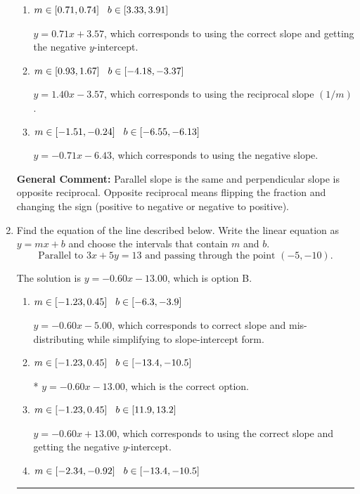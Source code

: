 \documentclass{extbook}[14pt]
\newcommand{\litem}[1]{\item #1

\rule{\textwidth}{0.4pt}}
\begin{document}
\begin{enumerate}
{\begin{enumerate}[label=\Alph*.]
* $y = 0.71x - 3.57$, which is the correct option.
\item \( m \in [0.71, 0.74] \hspace*{3mm} b \in [3.33, 3.91] \)

 $y = 0.71x + 3.57$, which corresponds to using the correct slope and getting the negative $y$-intercept.
\item \( m \in [0.93, 1.67] \hspace*{3mm} b \in [-4.18, -3.37] \)

 $y = 1.40x - 3.57$, which corresponds to using the reciprocal slope $(1/m)$.
\item \( m \in [-1.51, -0.24] \hspace*{3mm} b \in [-6.55, -6.13] \)

 $y = -0.71x - 6.43$, which corresponds to using the negative slope.
\end{enumerate}

\textbf{General Comment:} Parallel slope is the same and perpendicular slope is opposite reciprocal. Opposite reciprocal means flipping the fraction and changing the sign (positive to negative or negative to positive).
}
\litem{
Find the equation of the line described below. Write the linear equation as $ y=mx+b $ and choose the intervals that contain $m$ and $b$.
\[ \text{Parallel to } 3 x + 5 y = 13 \text{ and passing through the point } (-5, -10). \]

The solution is \( y = -0.60x - 13.00 \), which is option B.\begin{enumerate}[label=\Alph*.]
\item \( m \in [-1.23, 0.45] \hspace*{3mm} b \in [-6.3, -3.9] \)

 $y = -0.60x - 5.00$, which corresponds to correct slope and mis-distributing while simplifying to slope-intercept form.
\item \( m \in [-1.23, 0.45] \hspace*{3mm} b \in [-13.4, -10.5] \)

* $y = -0.60x - 13.00$, which is the correct option.
\item \( m \in [-1.23, 0.45] \hspace*{3mm} b \in [11.9, 13.2] \)

 $y = -0.60x + 13.00$, which corresponds to using the correct slope and getting the negative $y$-intercept.
\item \( m \in [-2.34, -0.92] \hspace*{3mm} b \in [-13.4, -10.5] \)


\end{enumerate}}
\end{enumerate}
\end{document}
